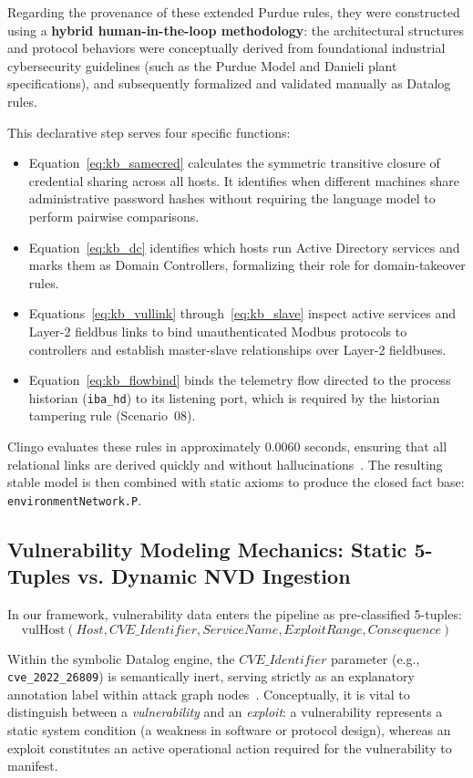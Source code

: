 \documentclass[target=mst,aauheader=aics,style=]{thud}
\begin{document}
Regarding the provenance of these extended Purdue rules, they were constructed using a \textbf{hybrid human-in-the-loop methodology}: the architectural structures and protocol behaviors were conceptually derived from foundational industrial cybersecurity guidelines (such as the Purdue Model and Danieli plant specifications), and subsequently formalized and validated manually as Datalog rules.

This declarative step serves four specific functions:
\begin{itemize}
    \item Equation~\eqref{eq:kb_samecred} calculates the symmetric transitive closure of credential sharing across all hosts. It identifies when different machines share administrative password hashes without requiring the language model to perform pairwise comparisons.
    \item Equation~\eqref{eq:kb_dc} identifies which hosts run Active Directory services and marks them as Domain Controllers, formalizing their role for domain-takeover rules.
    \item Equations~\eqref{eq:kb_vullink} through~\eqref{eq:kb_slave} inspect active services and Layer-2 fieldbus links to bind unauthenticated Modbus protocols to controllers and establish master-slave relationships over Layer-2 fieldbuses.
    \item Equation~\eqref{eq:kb_flowbind} binds the telemetry flow directed to the process historian (\texttt{iba\_hd}) to its listening port, which is required by the historian tampering rule (Scenario~08).
\end{itemize}
Clingo evaluates these rules in approximately $0.0060$ seconds, ensuring that all relational links are derived quickly and without hallucinations~\cite{clingo}. The resulting stable model is then combined with static axioms to produce the closed fact base: \texttt{environmentNetwork.P}.

\subsection{Vulnerability Modeling Mechanics: Static 5-Tuples vs. Dynamic NVD Ingestion}
In our framework, vulnerability data enters the pipeline as pre-classified 5-tuples:
\begin{equation}
    \text{vulHost}(Host, CVE\_Identifier, ServiceName, ExploitRange, Consequence)
\end{equation}

Within the symbolic Datalog engine, the $CVE\_Identifier$ parameter (e.g., \texttt{cve\_2022\_26809}) is semantically inert, serving strictly as an explanatory annotation label within attack graph nodes~\cite{Ou05}. Conceptually, it is vital to distinguish between a \textit{vulnerability} and an \textit{exploit}: a vulnerability represents a static system condition (a weakness in software or protocol design), whereas an exploit constitutes an active operational action required for the vulnerability to manifest. 
\end{document}
